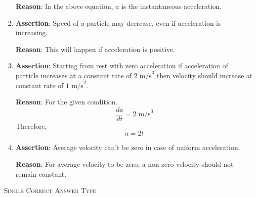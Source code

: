 \documentclass{article}
\renewcommand{\frac}[2]{\dfrac{#1}{#2}}
\begin{document}
\begin{enumerate}
    \textbf{Reason}: In the above equation, $a$ is the instantaneous acceleration.
    
    \item \textbf{Assertion}: Speed of a particle may decrease, even if acceleration is increasing.
    
    \textbf{Reason}: This will happen if acceleration is positive.
    
    \item \textbf{Assertion}: Starting from rest with zero acceleration if acceleration of particle increases at a constant rate of $2 \text{ m/s}^3$ then velocity should increase at constant rate of $1 \text{ m/s}^2$.
    
    \textbf{Reason}: For the given condition.
    \[
    \frac{da}{dt} = 2 \text{ m/s}^3
    \]
    Therefore,
    \[
    a = 2t
    \]
    
    \item \textbf{Assertion}: Average velocity can't be zero in case of uniform acceleration.
    
    \textbf{Reason}: For average velocity to be zero, a non zero velocity should not remain constant.
\end{enumerate}




\begin{center}
    \textsc{Single Correct Answer Type}
\end{center}
\end{document}
